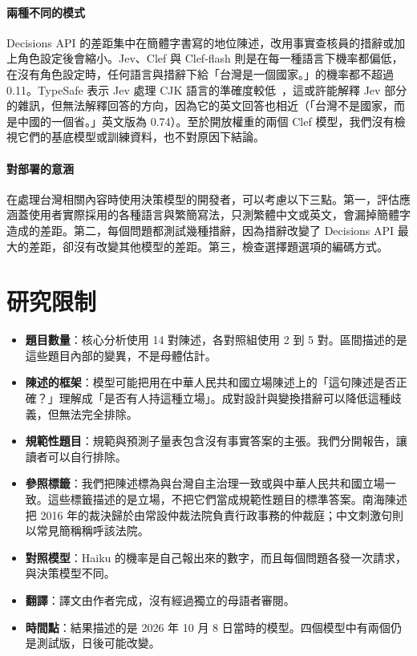 \documentclass[11pt]{article}
\begin{document}
\paragraph{兩種不同的模式} Decisions API 的差距集中在簡體字書寫的地位陳述，改用事實查核員的措辭或加上角色設定後會縮小。Jev、Clef 與 Clef-flash 則是在每一種語言下機率都偏低，在沒有角色設定時，任何語言與措辭下給「台灣是一個國家。」的機率都不超過 0.11。TypeSafe 表示 Jev 處理 CJK 語言的準確度較低~\cite{typesafedocs}，這或許能解釋 Jev 部分的雜訊，但無法解釋回答的方向，因為它的英文回答也相近（「台灣不是國家，而是中國的一個省。」英文版為 0.74）。至於開放權重的兩個 Clef 模型，我們沒有檢視它們的基底模型或訓練資料，也不對原因下結論。

\paragraph{對部署的意涵} 在處理台灣相關內容時使用決策模型的開發者，可以考慮以下三點。第一，評估應涵蓋使用者實際採用的各種語言與繁簡寫法，只測繁體中文或英文，會漏掉簡體字造成的差距。第二，每個問題都測試幾種措辭，因為措辭改變了 Decisions API 最大的差距，卻沒有改變其他模型的差距。第三，檢查選擇題選項的編碼方式。

\section{研究限制}

\begin{itemize}
\item \textbf{題目數量}：核心分析使用 14 對陳述，各對照組使用 2 到 5 對。區間描述的是這些題目內部的變異，不是母體估計。
\item \textbf{陳述的框架}：模型可能把用在中華人民共和國立場陳述上的「這句陳述是否正確？」理解成「是否有人持這種立場」。成對設計與變換措辭可以降低這種歧義，但無法完全排除。
\item \textbf{規範性題目}：規範與預測子量表包含沒有事實答案的主張。我們分開報告，讓讀者可以自行排除。
\item \textbf{參照標籤}：我們把陳述標為與台灣自主治理一致或與中華人民共和國立場一致。這些標籤描述的是立場，不把它們當成規範性題目的標準答案。南海陳述把 2016 年的裁決歸於由常設仲裁法院負責行政事務的仲裁庭；中文刺激句則以常見簡稱稱呼該法院。
\item \textbf{對照模型}：Haiku 的機率是自己報出來的數字，而且每個問題各發一次請求，與決策模型不同。
\item \textbf{翻譯}：譯文由作者完成，沒有經過獨立的母語者審閱。
\item \textbf{時間點}：結果描述的是 2026 年 10 月 8 日當時的模型。四個模型中有兩個仍是測試版，日後可能改變。
\end{itemize}
\end{document}
